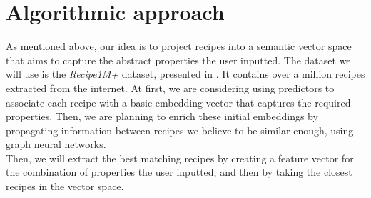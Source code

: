 \documentclass[]{article}
\begin{document}
\section{Algorithmic approach}
As mentioned above, our idea is to project recipes into a semantic vector space that aims to capture the abstract properties the user inputted. The dataset we will use is the \textit{Recipe1M+} dataset, presented in \cite{marin2019learning}. It contains over a million recipes extracted from the internet. At first, we are considering using predictors to associate each recipe with a basic embedding vector that captures the required properties. Then, we are planning to enrich these initial embeddings by propagating information between recipes we believe to be similar enough, using graph neural networks.\\
Then, we will extract the best matching recipes by creating a feature vector for the combination of properties the user inputted, and then by taking the closest recipes in the vector space.



\end{document}
